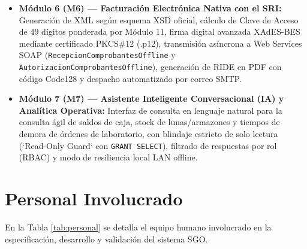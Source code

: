 \documentclass[12pt,a4paper]{report}
\begin{document}
\begin{itemize}
    \item \textbf{Módulo 6 (M6) --- Facturación Electrónica Nativa con el SRI:} Generación de XML según esquema XSD oficial, cálculo de Clave de Acceso de 49 dígitos ponderada por Módulo 11, firma digital avanzada XAdES-BES mediante certificado PKCS\#12 (.p12), transmisión asíncrona a Web Services SOAP (\texttt{RecepcionComprobantesOffline} y \texttt{AutorizacionComprobantesOffline}), generación de RIDE en PDF con código Code128 y despacho automatizado por correo SMTP.
    \item \textbf{Módulo 7 (M7) --- Asistente Inteligente Conversacional (IA) y Analítica Operativa:} Interfaz de consulta en lenguaje natural para la consulta ágil de saldos de caja, stock de lunas/armazones y tiempos de demora de órdenes de laboratorio, con blindaje estricto de solo lectura (`Read-Only Guard` con \texttt{GRANT SELECT}), filtrado de respuestas por rol (RBAC) y modo de resiliencia local LAN offline.
\end{itemize}

\section{Personal Involucrado}
En la Tabla \ref{tab:personal} se detalla el equipo humano involucrado en la especificación, desarrollo y validación del sistema SGO.
\end{document}
